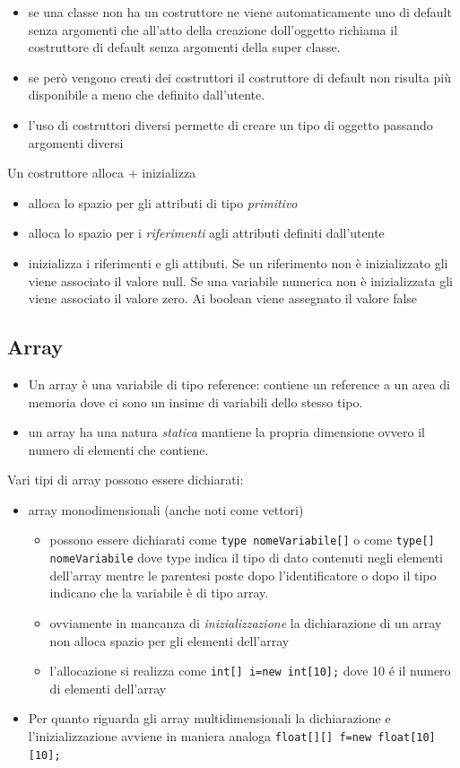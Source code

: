 \documentclass{article}
\theoremstyle{definition}
\begin{document}
\begin{itemize}
\item se una classe non ha un costruttore ne viene automaticamente uno di default senza argomenti che all'atto della creazione doll'oggetto richiama il costruttore di default senza argomenti della super classe.
\item se per\`o vengono creati dei costruttori il costruttore di default non risulta pi\`u disponibile a meno che definito dall'utente. 
\item l'uso di costruttori diversi permette di creare un tipo di oggetto passando argomenti diversi 
\end{itemize}

Un costruttore alloca + inizializza
\begin{itemize}
\item alloca lo spazio per gli attributi di tipo \emph{primitivo}
\item alloca lo spazio per i \emph{riferimenti} agli attributi definiti dall'utente
\item inizializza i riferimenti e gli attibuti. Se un riferimento non \`e inizializzato gli viene associato il valore null. Se una variabile numerica non \`e inizializzata gli viene associato il valore zero. Ai boolean viene assegnato il valore false
\end{itemize}


\subsection{Array}
\begin{itemize}
\item Un array \`e una variabile di tipo reference: contiene un reference a un area di memoria dove ci sono un insime di variabili dello stesso tipo.
\item un array ha una natura \emph{statica} mantiene la propria dimensione ovvero il numero di elementi che contiene.
\end{itemize}

Vari tipi di array possono essere dichiarati:
\begin{itemize}
\item array monodimensionali (anche noti come vettori)
\begin{itemize}
\item possono essere dichiarati come \texttt{type nomeVariabile[]} o come \texttt{type[] nomeVariabile} dove type indica il tipo di dato contenuti negli elementi dell'array mentre le parentesi poste dopo l'identificatore o dopo il tipo indicano che la variabile \`e di tipo array.
\item ovviamente in mancanza di \emph{inizializzazione} la dichiarazione di un array non alloca spazio per gli elementi dell'array
\item l'allocazione si realizza come \texttt{int[] i=new int[10];} dove 10 \'e il numero di elementi dell'array
\end{itemize}
\item Per quanto riguarda gli array multidimensionali la dichiarazione e l'inizializzazione avviene in maniera analoga \texttt{float[][] f=new float[10][10];}
\end{itemize}
\end{document}
